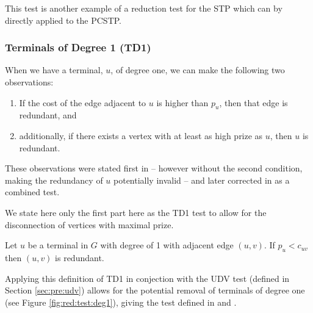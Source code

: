 This test is another example of a reduction test for the STP which can by directly applied to
 the PCSTP.
 \subsubsection{Terminals of Degree 1 (TD1)}\label{sec:pre:td1}
 When we have a terminal, $u$, of degree one, we can make the following two observations:
 \begin{enumerate}
 \item If the cost of the edge adjacent to $u$ is higher than $p_u$, then that edge is redundant, and
 \item additionally, if there exists a vertex with at least as high prize as $u$, then $u$ is redundant.
 \end{enumerate}
 These observations were stated first in \cite{uchoa2006reduction} -- however without the second condition,
 making the redundancy of $u$ potentially invalid -- and later corrected in \cite{rehfeldt2016reduction} as a combined test.

 We state here only the first part here as the TD1 test to allow for the disconnection of vertices with maximal prize.
 \begin{theorem}
   Let $u$ be a terminal in $G$ with degree of 1 with adjacent edge $(u, v)$. If
   $p_u < c_{uv}$ then $(u,v)$ is redundant.
 \end{theorem}

 Applying this definition of TD1 in conjection with the UDV test (defined in Section \ref{sec:pre:udv})
 allows for the potential removal of terminals of degree one (see Figure \ref{fig:red:test:deg1}), giving the
  test defined in \cite{uchoa2006reduction} and \cite{rehfeldt2016reduction}.


